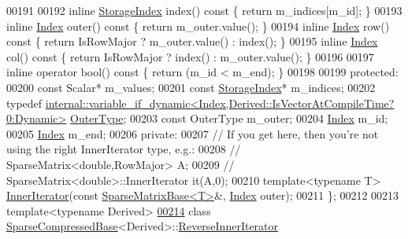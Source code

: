 \begin{DoxyCode}
00191 
00192     \textcolor{keyword}{inline} \hyperlink{group___sparse_core___module_a0b540ba724726ebe953f8c0df06081ed}{StorageIndex} index()\textcolor{keyword}{ const }\{ \textcolor{keywordflow}{return} m\_indices[m\_id]; \}
00193     \textcolor{keyword}{inline} \hyperlink{group___core___module_a554f30542cc2316add4b1ea0a492ff02}{Index} outer()\textcolor{keyword}{ const }\{ \textcolor{keywordflow}{return} m\_outer.value(); \}
00194     \textcolor{keyword}{inline} \hyperlink{group___core___module_a554f30542cc2316add4b1ea0a492ff02}{Index} row()\textcolor{keyword}{ const }\{ \textcolor{keywordflow}{return} IsRowMajor ? m\_outer.value() : index(); \}
00195     \textcolor{keyword}{inline} \hyperlink{group___core___module_a554f30542cc2316add4b1ea0a492ff02}{Index} col()\textcolor{keyword}{ const }\{ \textcolor{keywordflow}{return} IsRowMajor ? index() : m\_outer.value(); \}
00196 
00197     \textcolor{keyword}{inline} \textcolor{keyword}{operator} bool()\textcolor{keyword}{ const }\{ \textcolor{keywordflow}{return} (m\_id < m\_end); \}
00198 
00199   \textcolor{keyword}{protected}:
00200     \textcolor{keyword}{const} Scalar* m\_values;
00201     \textcolor{keyword}{const} \hyperlink{group___sparse_core___module_a0b540ba724726ebe953f8c0df06081ed}{StorageIndex}* m\_indices;
00202     \textcolor{keyword}{typedef} 
      \hyperlink{class_eigen_1_1internal_1_1variable__if__dynamic}{internal::variable\_if\_dynamic<Index,Derived::IsVectorAtCompileTime?0:Dynamic>}
       \hyperlink{class_eigen_1_1internal_1_1variable__if__dynamic}{OuterType};
00203     \textcolor{keyword}{const} OuterType m\_outer;
00204     \hyperlink{group___core___module_a554f30542cc2316add4b1ea0a492ff02}{Index} m\_id;
00205     \hyperlink{group___core___module_a554f30542cc2316add4b1ea0a492ff02}{Index} m\_end;
00206   \textcolor{keyword}{private}:
00207     \textcolor{comment}{// If you get here, then you're not using the right InnerIterator type, e.g.:}
00208     \textcolor{comment}{//   SparseMatrix<double,RowMajor> A;}
00209     \textcolor{comment}{//   SparseMatrix<double>::InnerIterator it(A,0);}
00210     \textcolor{keyword}{template}<\textcolor{keyword}{typename} T> \hyperlink{class_eigen_1_1_sparse_compressed_base_1_1_inner_iterator}{InnerIterator}(\textcolor{keyword}{const} \hyperlink{group___sparse_core___module_class_eigen_1_1_sparse_matrix_base}{SparseMatrixBase<T>}&, 
      \hyperlink{group___core___module_a554f30542cc2316add4b1ea0a492ff02}{Index} outer);
00211 \};
00212 
00213 \textcolor{keyword}{template}<\textcolor{keyword}{typename} Derived>
\hyperlink{class_eigen_1_1_sparse_compressed_base_1_1_reverse_inner_iterator}{00214} \textcolor{keyword}{class }\hyperlink{group___sparse_core___module_class_eigen_1_1_sparse_compressed_base}{SparseCompressedBase}<Derived>::\hyperlink{class_eigen_1_1_sparse_compressed_base_1_1_reverse_inner_iterator}{ReverseInnerIterator}

\end{DoxyCode}
